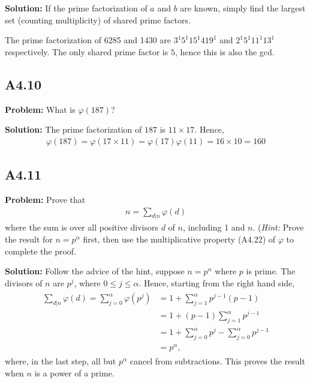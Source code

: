 \documentclass{article}
\begin{document}
\textbf{Solution:} If the prime factorization of $a$ and $b$ are known, simply find the largest set (counting multiplicity) of shared prime factors. 

The prime factorization of 6285 and 1430 are $3^1 5^1 15^1 419^1$ and $2^1 5^1 11^1 13^1$ respectively. The only shared prime factor is $5$, hence this is also the gcd.

\subsection*{A4.10}
\textbf{Problem:} What is $\varphi(187)$?

\textbf{Solution:} The prime factorization of $187$ is $11\times17$. Hence,
\begin{align}
    \varphi(187) = \varphi(17\times 11) = \varphi(17)\varphi(11) = 16 \times 10 = 160
\end{align}

\subsection*{A4.11}
\textbf{Problem:} Prove that
\begin{align}
    n = \sum_{d|n} \varphi(d)
\end{align}
where the sum is over all positive divisors $d$ of $n$, including 1 and $n$. (\emph{Hint:} Prove the result for $n=p^\alpha$ first, then use the multiplicative property (A4.22) of $\varphi$ to complete the proof.

\textbf{Solution:} Follow the advice of the hint, suppose $n=p^\alpha$ where $p$ is prime. The divisors of $n$ are $p^j$, where $0\leq j \leq \alpha$. Hence, starting from the right hand side,
\begin{align}
\begin{aligned}
    \sum_{d|n} \varphi(d) = \sum_{j=0}^\alpha \varphi(p^j) &=1 +  \sum_{j=1}^\alpha p^{j-1}(p-1)\\
    &= 1+ (p-1)\sum_{j=1}^\alpha p^{j-1} \\
    &= 1 + \sum_{j=0}^\alpha p^j -\sum_{j=0}^\alpha p^{j-1} \\
    &= p^\alpha,
\end{aligned}
\end{align}
where, in the last step, all but $p^\alpha$ cancel from subtractions. This proves the result when $n$ is a power of a prime.
\end{document}
